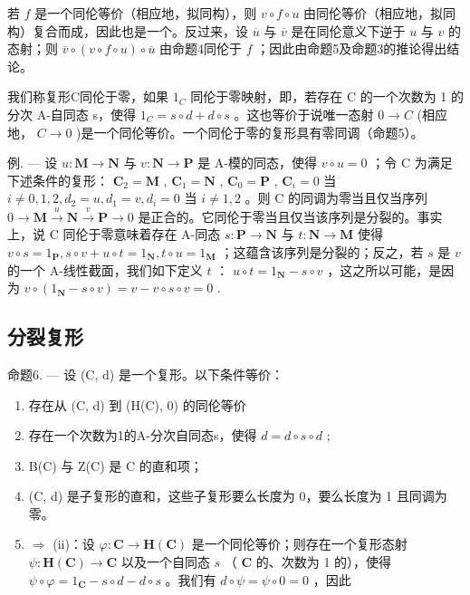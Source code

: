 若 \(f\) 是一个同伦等价（相应地，拟同构），则 \(v \circ f \circ u\) 由同伦等价（相应地，拟同构）复合而成，因此也是一个。反过来，设 \(\overline{u}\) 与 \(\overline{v}\) 是在同伦意义下逆于 \(u\) 与 \(v\) 的态射；则 \(\overline{v} \circ (v \circ f \circ u) \circ \overline{u}\) 由命题4同伦于 \(f\) ；因此由命题5及命题3的推论得出结论。

我们称复形C同伦于零，如果 \(1_{C}\) 同伦于零映射，即，若存在 C 的一个次数为 1 的分次 A-自同态 s，使得 \(1_{C} = s \circ d + d \circ s\) 。这也等价于说唯一态射 \(0 \to C\) (相应地， \(C \to 0\) )是一个同伦等价。一个同伦于零的复形具有零同调（命题5）。

例. --- 设 \(u: \mathbf{M} \to \mathbf{N}\) 与 \(v: \mathbf{N} \to \mathbf{P}\) 是 A-模的同态，使得 \(v \circ u = 0\) ；令 C 为满足下述条件的复形： \(\mathbf{C}_2 = \mathbf{M}\) , \(\mathbf{C}_1 = \mathbf{N}\) , \(\mathbf{C}_0 = \mathbf{P}\) , \(\mathbf{C}_i = 0\) 当 \(i \neq 0, 1, 2, d_2 = u, d_1 = v, d_i = 0\) 当 \(i \neq 1, 2\) 。则 C 的同调为零当且仅当序列 \(0 \to \mathbf{M} \xrightarrow{u} \mathbf{N} \xrightarrow{v} \mathbf{P} \to 0\) 是正合的。它同伦于零当且仅当该序列是分裂的。事实上，说 C 同伦于零意味着存在 A-同态 \(s: \mathbf{P} \to \mathbf{N}\) 与 \(t: \mathbf{N} \to \mathbf{M}\) 使得 \(v \circ s = 1_{\mathbf{P}}, s \circ v + u \circ t = 1_{\mathbf{N}}, t \circ u = 1_{\mathbf{M}}\) ；这蕴含该序列是分裂的；反之，若 \(s\) 是 \(v\) 的一个 A-线性截面，我们如下定义 \(t\) ： \(u \circ t = 1_{\mathbf{N}} - s \circ v\) ，这之所以可能，是因为 \(v \circ (1_{\mathbf{N}} - s \circ v) = v - v \circ s \circ v = 0\) .

\subsection{分裂复形}

命题6. — 设 (C, d) 是一个复形。以下条件等价：

\begin{enumerate}
\def\labelenumi{(\roman{enumi})}
\item
  存在从 (C, d) 到 (H(C), 0) 的同伦等价
\item
  存在一个次数为1的A-分次自同态s，使得 \(d = d \circ s \circ d\) ;
\item
  B(C) 与 Z(C) 是 C 的直和项；
\item
  (C, d) 是子复形的直和，这些子复形要么长度为 0，要么长度为 1 且同调为零。
\item
  \(\Rightarrow\) (ii)：设 \(\varphi: \mathbf{C} \to \mathbf{H}(\mathbf{C})\) 是一个同伦等价；则存在一个复形态射 \(\psi: \mathbf{H}(\mathbf{C}) \to \mathbf{C}\) 以及一个自同态 \(s\) （ \(\mathbf{C}\) 的、次数为 1 的），使得 \(\psi \circ \varphi = 1_{\mathbf{C}} - s \circ d - d \circ s\) 。我们有 \(d \circ \psi = \psi \circ 0 = 0\) ，因此
\end{enumerate}

